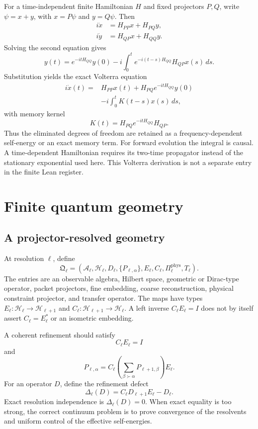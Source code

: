\documentclass[11pt]{article}
\theoremstyle{definition}
\theoremstyle{remark}
\newcommand{\cA}{\mathcal A}
\newcommand{\cH}{\mathcal H}
\begin{document}
For a time-independent finite Hamiltonian $H$ and fixed projectors $P,Q$, write $\psi=x+y$, with $x=P\psi$ and $y=Q\psi$. Then
\[
\begin{aligned}
i\dot x&=H_{PP}x+H_{PQ}y,\\
i\dot y&=H_{QP}x+H_{QQ}y.
\end{aligned}
\]
Solving the second equation gives
\[
y(t)
=e^{-itH_{QQ}}y(0)
-i\int_0^t e^{-i(t-s)H_{QQ}}H_{QP}x(s)\,ds.
\]
Substitution yields the exact Volterra equation
\[
\boxed{
\begin{aligned}
i\dot x(t)
={}&H_{PP}x(t)
+H_{PQ}e^{-itH_{QQ}}y(0)\\
&-i\int_0^t
K(t-s)x(s)\,ds,
\end{aligned}
}
\]
with memory kernel
\[
\boxed{
K(t)=H_{PQ}e^{-itH_{QQ}}H_{QP}.
}
\]
Thus the eliminated degrees of freedom are retained as a frequency-dependent self-energy or an exact memory term. For forward evolution the integral is causal. A time-dependent Hamiltonian requires its two-time propagator instead of the stationary exponential used here. This Volterra derivation is not a separate entry in the finite Lean register.

\section{Finite quantum geometry}

\subsection{A projector-resolved geometry}

At resolution $\ell$, define
\[
\boxed{
\mathfrak Q_\ell
=
\left(
\cA_\ell,
\cH_\ell,
D_\ell,
\{P_{\ell,\alpha}\},
E_\ell,
C_\ell,
\Pi_\ell^{\mathrm{phys}},
T_\ell
\right).
}
\]
The entries are an observable algebra, Hilbert space, geometric or Dirac-type operator, packet projectors, fine embedding, coarse reconstruction, physical constraint projector, and transfer operator. The maps have types $E_\ell:\cH_\ell\to\cH_{\ell+1}$ and $C_\ell:\cH_{\ell+1}\to\cH_\ell$. A left inverse $C_\ell E_\ell=I$ does not by itself assert $C_\ell=E_\ell^*$ or an isometric embedding.

A coherent refinement should satisfy
\[
C_\ell E_\ell=I
\]
and
\[
\boxed{
P_{\ell,\alpha}
=
C_\ell
\left(
\sum_{\beta\succ\alpha}P_{\ell+1,\beta}
\right)
E_\ell.
}
\]
For an operator $D$, define the refinement defect
\[
\Delta_\ell(D)
=C_\ell D_{\ell+1}E_\ell-D_\ell.
\]
Exact resolution independence is $\Delta_\ell(D)=0$. When exact equality is too strong, the correct continuum problem is to prove convergence of the resolvents and uniform control of the effective self-energies.
\end{document}
